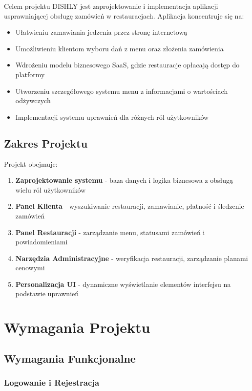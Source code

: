 ﻿\documentclass[12pt,a4paper,utf-8]{article}
\begin{document}
Celem projektu DISHLY jest zaprojektowanie i implementacja aplikacji usprawniającej obsługę zamówień w restauracjach. Aplikacja koncentruje się na:
\begin{itemize}
    \item Ułatwieniu zamawiania jedzenia przez stronę internetową
    \item Umożliwieniu klientom wyboru dań z menu oraz złożenia zamówienia
    \item Wdrożeniu modelu biznesowego SaaS, gdzie restauracje opłacają dostęp do platformy
    \item Utworzeniu szczegółowego systemu menu z informacjami o wartościach odżywczych
    \item Implementacji systemu uprawnień dla różnych ról użytkowników
\end{itemize}

\subsection{Zakres Projektu}

Projekt obejmuje:
\begin{enumerate}
    \item \textbf{Zaprojektowanie systemu} - baza danych i logika biznesowa z obsługą wielu ról użytkowników
    \item \textbf{Panel Klienta} - wyszukiwanie restauracji, zamawianie, płatność i śledzenie zamówień
    \item \textbf{Panel Restauracji} - zarządzanie menu, statusami zamówień i powiadomieniami
    \item \textbf{Narzędzia Administracyjne} - weryfikacja restauracji, zarządzanie planami cenowymi
    \item \textbf{Personalizacja UI} - dynamiczne wyświetlanie elementów interfejsu na podstawie uprawnień
\end{enumerate}

\newpage

\section{Wymagania Projektu}

\subsection{Wymagania Funkcjonalne}

\subsubsection{Logowanie i Rejestracja}
\end{document}
